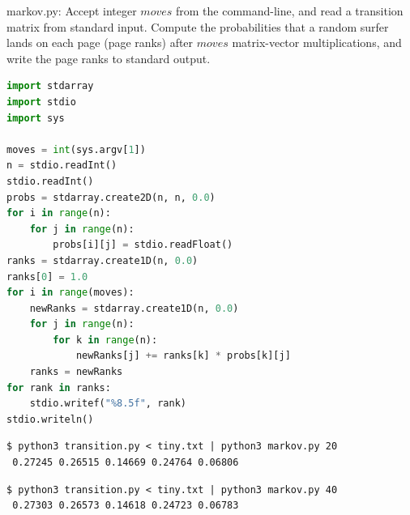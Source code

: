 \documentclass[8pt,a4paper,compress]{beamer}
\begin{document}
\begin{frame}[fragile]
\pause

\begin{framed}
\tiny markov.py: Accept integer $moves$ from the command-line, and read a transition matrix from standard input. Compute the probabilities that a
random surfer lands on each page (page ranks) after $moves$ matrix-vector multiplications, and write the page ranks to standard output.
\end{framed}

\begin{lstlisting}[language=Python]
import stdarray
import stdio
import sys

moves = int(sys.argv[1])
n = stdio.readInt()
stdio.readInt()
probs = stdarray.create2D(n, n, 0.0)
for i in range(n):
    for j in range(n):
        probs[i][j] = stdio.readFloat()
ranks = stdarray.create1D(n, 0.0)
ranks[0] = 1.0
for i in range(moves):
    newRanks = stdarray.create1D(n, 0.0)
    for j in range(n):
        for k in range(n):
            newRanks[j] += ranks[k] * probs[k][j]
    ranks = newRanks
for rank in ranks:
    stdio.writef("%8.5f", rank)
stdio.writeln()
\end{lstlisting}

\pause

\begin{lstlisting}[language={}]
$ python3 transition.py < tiny.txt | python3 markov.py 20
 0.27245 0.26515 0.14669 0.24764 0.06806
\end{lstlisting}

\pause

\begin{lstlisting}[language={}]
$ python3 transition.py < tiny.txt | python3 markov.py 40
 0.27303 0.26573 0.14618 0.24723 0.06783
\end{lstlisting}
\end{frame}
\end{document}
